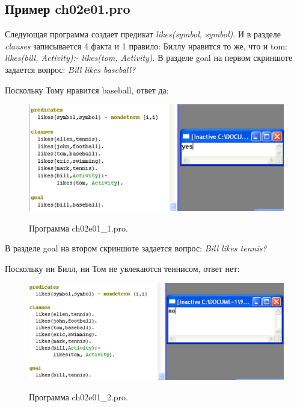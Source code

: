 \documentclass[a4paper,12pt]{article}
\begin{document}
	\subsection{Пример ch02e01.pro}
	
	Следующая программа создает предикат \textit{likes(symbol, symbol)}. И в разделе \textit{clauses} записывается 4 факта и 1 правило: Биллу нравится то же, что и tom: \textit{likes(bill, Activity):- likes(tom, Activity)}. В разделе goal на первом скриншоте задается вопрос: \textit{Bill likes baseball?}
	
	Поскольку Тому нравится baseball, ответ да:
	
	\begin{figure}[h!]
		\begin{center}
			{\includegraphics[scale = 0.7]{ch02e01_1.png}}
			\label{ch02e01_1}
		\end{center}
		\caption{Программа ch02e01\_1.pro.}
	\end{figure}

	\newpage

	В разделе goal на втором скриншоте задается вопрос: \textit{Bill likes tennis?}
	
	Поскольку ни Билл, ни Том не увлекаются теннисом, ответ нет:
	
	\begin{figure}[h!]
		\begin{center}
			{\includegraphics[scale = 0.7]{ch02e01_2.png}}
			\label{ch02e01_2}
		\end{center}
		\caption{Программа ch02e01\_2.pro.}
	\end{figure}
	
\end{document}

